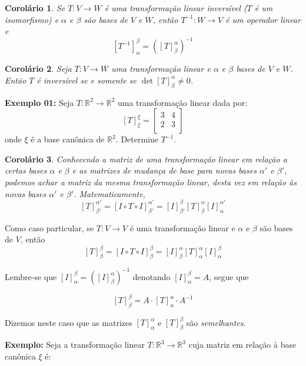 \documentclass[oneside,a4paper,12pt]{article}
\newtheorem{corollary}{Corolário}[section]
\begin{document}
\begin{corollary}
	Se $T: V \rightarrow W$ é uma transformação linear inversível ($T$ é um isomorfismo) e $\alpha$ e $\beta$ são bases de $V$ e $W$, então $T^{-1}:W \rightarrow V$ é um operador linear e 
	$$[T^{-1}]_{\alpha}^{\beta} = ([T]_{\beta}^{\alpha})^{-1}$$
	\vspace{100pt}
\end{corollary}

\begin{corollary}
	Seja $T: V \rightarrow W$ uma transformação linear e $\alpha$ e $\beta$ bases de $V$ e $W$. Então $T$ é inversível se e somente se $\det[T]_{\beta}^{\alpha} \neq 0$.
\end{corollary}

{\bf Exemplo 01: } Seja $T: \mathbb{R}^2 \rightarrow \mathbb{R}^2$ uma transformação linear dada por:
$$[T]_{\xi}^{\xi} = \left[
\begin{array}{cc}
3	&	4	\\
2	&	3	\\
\end{array}
\right] 
$$
 onde $\xi$ é a base canônica de $\mathbb{R}^2$. Determine $T^{-1}$.
 
 \begin{corollary}
 	Conhecendo a matriz de uma transformação linear em relação a certas bases $\alpha$ e $\beta$ e as matrizes de mudança de base para novas bases $\alpha'$ e $\beta'$, podemos achar a matriz da mesma transformação linear, desta vez em relação às novas bases $\alpha'$ e $\beta'$. Matematicamente,
 	$$[T]_{\beta'}^{\alpha'} = [I \circ T \circ I]_{\beta'}^{\alpha'} = [I]_{\beta'}^{\beta}[T]_{\beta}^{\alpha}[I]_{\alpha}^{\alpha'}$$
 \end{corollary}
Como caso particular, se $T: V \rightarrow V$ é uma transformação linear e $\alpha$ e $\beta$ são bases de $V$, então
$$[T]_{\beta}^{\beta} = [I \circ T \circ I]_{\beta}^{\beta} = [I]_{\beta}^{\alpha}[T]_{\alpha}^{\alpha}[I]_{\alpha}^{\beta}$$

Lembre-se que $[I]_{\alpha}^{\beta} = ([I]_{\beta}^{\alpha})^{-1}$ denotando $[I]_{\alpha}^{\beta} = A$, segue que

$$[T]_{\beta}^{\beta} = A \cdot [T]_{\alpha}^{\alpha} \cdot A^{-1}$$

Dizemos neste caso que as matrizes $[T]_{\alpha}^{\alpha}$ e $[T]_{\beta}^{\beta}$ são \emph{semelhantes}.

{\bf Exemplo: } Seja a transformação linear $T: \mathbb{R}^3 \rightarrow \mathbb{R}^3$ cuja matriz em relação à base canônica $\xi$ é:
\end{document}
